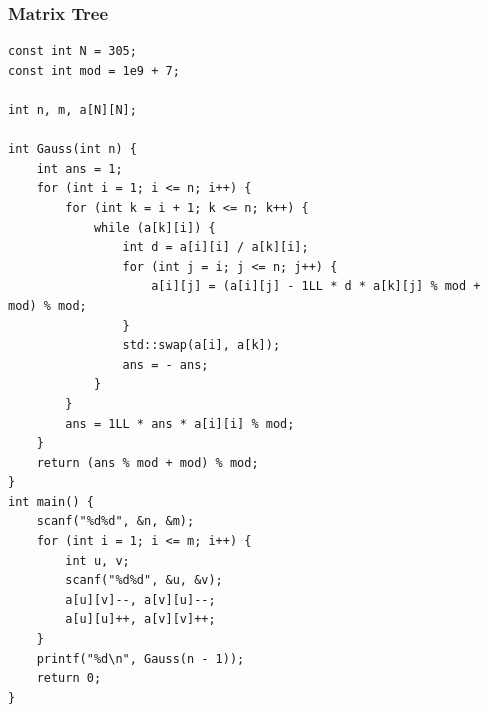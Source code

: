 \documentclass[twoside]{article}
\begin{document}
\subsubsection{Matrix Tree}
\begin{lstlisting}
const int N = 305;
const int mod = 1e9 + 7;

int n, m, a[N][N];

int Gauss(int n) {
    int ans = 1;
    for (int i = 1; i <= n; i++) {
        for (int k = i + 1; k <= n; k++) {
            while (a[k][i]) {
                int d = a[i][i] / a[k][i];
                for (int j = i; j <= n; j++) {
                    a[i][j] = (a[i][j] - 1LL * d * a[k][j] % mod + mod) % mod;
                }
                std::swap(a[i], a[k]);
                ans = - ans;
            }
        }
        ans = 1LL * ans * a[i][i] % mod;
    }
    return (ans % mod + mod) % mod;
}
int main() {
    scanf("%d%d", &n, &m);
    for (int i = 1; i <= m; i++) {
        int u, v;
        scanf("%d%d", &u, &v);
        a[u][v]--, a[v][u]--;
        a[u][u]++, a[v][v]++;
    }
    printf("%d\n", Gauss(n - 1));
    return 0;
}\end{lstlisting}
\end{document}
